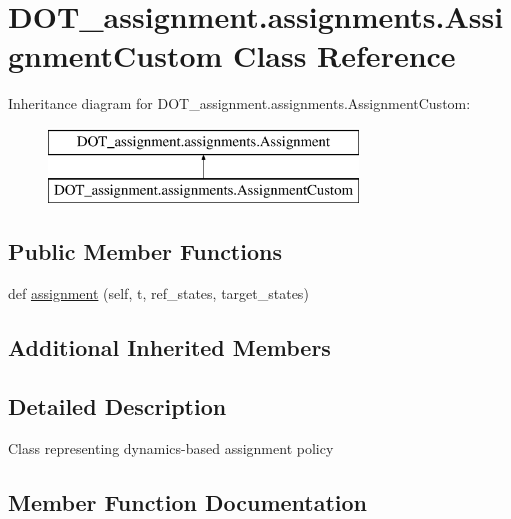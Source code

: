 \hypertarget{class_d_o_t__assignment_1_1assignments_1_1_assignment_custom}{}\section{D\+O\+T\+\_\+assignment.\+assignments.\+Assignment\+Custom Class Reference}
\label{class_d_o_t__assignment_1_1assignments_1_1_assignment_custom}
Inheritance diagram for D\+O\+T\+\_\+assignment.\+assignments.\+Assignment\+Custom\+:\begin{figure}[H]
\begin{center}
\leavevmode
\includegraphics[height=2.000000cm]{class_d_o_t__assignment_1_1assignments_1_1_assignment_custom}
\end{center}
\end{figure}
\subsection*{Public Member Functions}
\begin{DoxyCompactItemize}
\item 
def \mbox{\hyperlink{class_d_o_t__assignment_1_1assignments_1_1_assignment_custom_acab10eeb9d00b8e4194d2e3cefebbe22}{assignment}} (self, t, ref\+\_\+states, target\+\_\+states)
\end{DoxyCompactItemize}
\subsection*{Additional Inherited Members}


\subsection{Detailed Description}
\begin{DoxyVerb}Class representing dynamics-based assignment policy
\end{DoxyVerb}
 

\subsection{Member Function Documentation}
\mbox{\label{class_d_o_t__assignment_1_1assignments_1_1_assignment_custom_acab10eeb9d00b8e4194d2e3cefebbe22}} 

